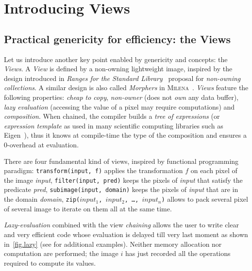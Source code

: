 \section{Introducing Views}
\label{sec.views}


\subsection{Practical genericity for efficiency: the Views}
\label{subsec.views}

Let us introduce another key point enabled by genericity and concepts: the \emph{Views}. A \emph{View} is defined by a
non-owning lightweight image, inspired by the design introduced in \emph{Ranges for the Standard
  Library}~\citep{niebler.2014.ranges} proposal for \emph{non-owning collections}. A similar design is also called
\emph{Morphers} in \textsc{Milena}~\citep{levillain.2009.ismm, geraud.2012.hdr}. \emph{Views} feature the following
properties: \emph{cheap to copy}, \emph{non-owner} (does not \emph{own} any data buffer), \emph{lazy evaluation}
(accessing the value of a pixel may require computations) and \emph{composition}. When chained, the compiler builds a
\emph{tree of expressions} (or \emph{expression template} as used in many scientific computing libraries such as
Eigen~\cite{guennebaud.2010.eigen}), thus it knows at compile-time the type of the composition and ensures a 0-overhead
at evaluation.

There are four fundamental kind of views, inspired by functional programming paradigm: \texttt{transform(input, f)}
applies the transformation $f$ on each pixel of the image \emph{input}, \texttt{filter(input, pred)} keeps the pixels of
\emph{input} that satisfy the predicate \emph{pred}, \texttt{subimage(input, domain)} keeps the pixels of \emph{input}
that are in the domain \emph{domain}, \texttt{zip($input_1$, $input_2$, \ldots, $input_n$)} allows to pack several pixel
of several image to iterate on them all at the same time.

\emph{Lazy-evaluation} combined with the view \emph{chaining} allows the user to write clear and very efficient code
whose evaluation is delayed till very last moment as shown in~\cref{fig.lazy} (see \cite{geraud.2018.gtgdmm} for
additional examples). Neither memory allocation nor computation are performed; the image $i$ has just recorded all the
operations required to compute its values.

